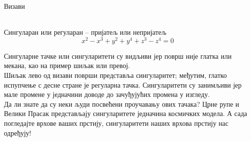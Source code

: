 \documentclass[en]{./../../common/SurferDesc}%
\begin{document}
\footnotesize


\begin{surferPage}
  \begin{surferTitle}Визави\end{surferTitle} 
  \\
Сингуларан или регуларан – пријатељ или непријатељ\\
\smallskip
\[x^2	- x^3+ y^2+ y^4+ z^3- z^4	=  0\]

\vspace{0.3cm}
Сингуларне тачке или сингуларитети су видљиви јер површ није глатка или мекана, као на пример шиљак или превој.\\
\vspace{0.3cm}
Шиљак лево од визави површи представља сингуларитет; међутим, глатко испупчење с десне стране је регуларна тачка. Сингуларитети су занимљиви јер мале промене у једначини доводе до зачуђујућих промена у изгледу. \\

\vspace{0.3cm}
Да ли знате да су неки људи посвећени проучавању ових тачака? Црне рупе и Велики Прасак представљају сингуларитете једначина космичких модела. А сада погледајте врхове ваших прстију, сингуларитети наших врхова прстију нас одређују! 

  \begin{surferText}
     \end{surferText}
\end{surferPage}
\end{document}
